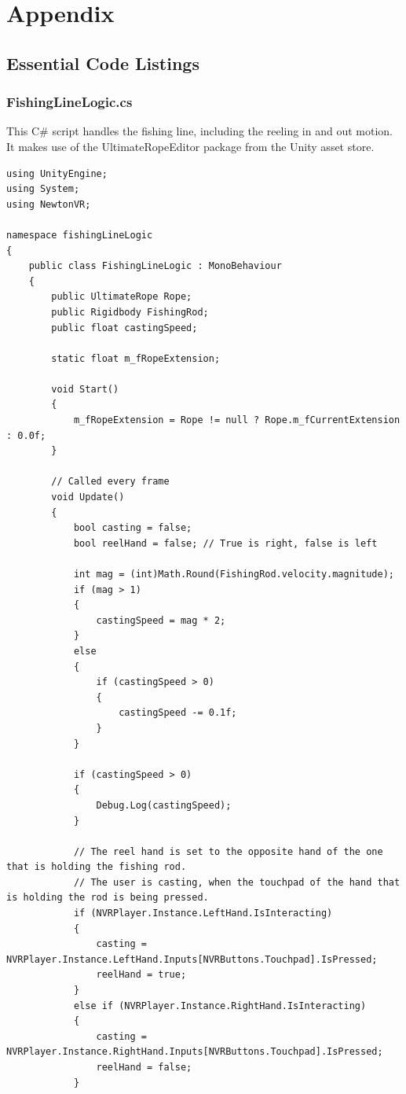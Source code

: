 \documentclass[10pt,journal,compsoc,onecolumn, draftclsnofoot]{IEEEtran}
\begin{document}
\clearpage
\section{Appendix}
\subsection{Essential Code Listings}
\subsubsection{FishingLineLogic.cs}
This C\# script handles the fishing line, including the reeling in and out motion. It makes use of the UltimateRopeEditor package from the Unity asset store. \\

\begin{verbatim}
using UnityEngine;
using System;
using NewtonVR;

namespace fishingLineLogic
{
    public class FishingLineLogic : MonoBehaviour
    {
        public UltimateRope Rope;
        public Rigidbody FishingRod;
        public float castingSpeed;

        static float m_fRopeExtension;

        void Start()
        {
            m_fRopeExtension = Rope != null ? Rope.m_fCurrentExtension : 0.0f;
        }

        // Called every frame
        void Update()
        {
            bool casting = false;
            bool reelHand = false; // True is right, false is left

            int mag = (int)Math.Round(FishingRod.velocity.magnitude);
            if (mag > 1)
            {
                castingSpeed = mag * 2;
            }
            else
            {
                if (castingSpeed > 0)
                {
                    castingSpeed -= 0.1f;
                }
            }

            if (castingSpeed > 0)
            {
                Debug.Log(castingSpeed);
            }

            // The reel hand is set to the opposite hand of the one that is holding the fishing rod.
            // The user is casting, when the touchpad of the hand that is holding the rod is being pressed.
            if (NVRPlayer.Instance.LeftHand.IsInteracting)
            {
                casting = NVRPlayer.Instance.LeftHand.Inputs[NVRButtons.Touchpad].IsPressed;
                reelHand = true;
            }
            else if (NVRPlayer.Instance.RightHand.IsInteracting)
            {
                casting = NVRPlayer.Instance.RightHand.Inputs[NVRButtons.Touchpad].IsPressed;
                reelHand = false;
            }


\end{verbatim}
\end{document}
